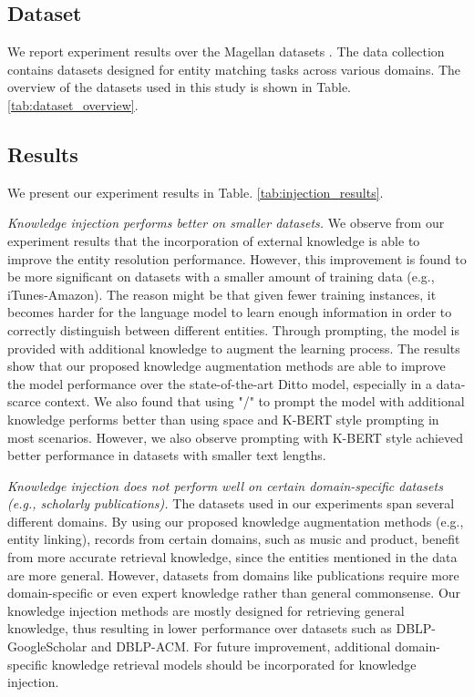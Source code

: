 \subsection{Dataset}

We report experiment results over the Magellan datasets \cite{magellandata}. The data collection contains datasets designed for entity matching tasks across various domains. The overview of the datasets used in this study is shown in Table. \ref{tab:dataset_overview}.





\subsection{Results}
We present our experiment results in Table. \ref{tab:injection_results}.

\textit{Knowledge injection performs better on smaller datasets.}
We observe from our experiment results that the incorporation of external knowledge is able to improve the entity resolution performance. However, this improvement is found to be more significant on datasets with a smaller amount of training data (e.g., iTunes-Amazon). The reason might be that given fewer training instances, it becomes harder for the language model to learn enough information in order to correctly distinguish between different entities. 
Through prompting, the model is provided with additional knowledge to augment the learning process. The results show that our proposed knowledge augmentation methods are able to improve the model performance over the state-of-the-art Ditto model, especially in a data-scarce context.
We also found that using "/" to prompt the model with additional knowledge performs better than using space and K-BERT style prompting in most scenarios. However, we also observe prompting with K-BERT style achieved better performance in datasets with smaller text lengths. 

\textit{Knowledge injection does not perform well on certain domain-specific datasets (e.g., scholarly publications).}
The datasets used in our experiments span several different domains. By using our proposed knowledge augmentation methods (e.g., entity linking), records from certain domains, such as music and product, benefit from more accurate retrieval knowledge, since the entities mentioned in the data are more general. 
However, datasets from domains like publications require more domain-specific or even expert knowledge rather than general commonsense. Our knowledge injection methods are mostly designed for retrieving general knowledge, thus resulting in lower performance over datasets such as DBLP-GoogleScholar and DBLP-ACM. For future improvement, additional domain-specific knowledge retrieval models should be incorporated for knowledge injection. 

